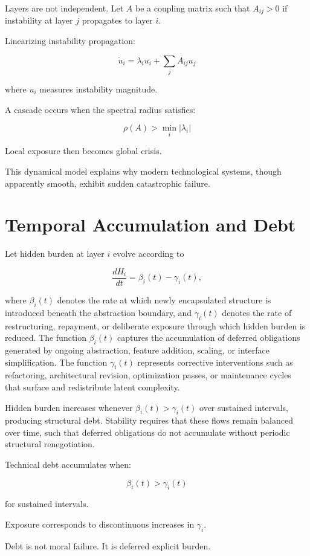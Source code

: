\documentclass[11pt,openany]{book}
\begin{document}
Layers are not independent.
Let $A$ be a coupling matrix such that $A_{ij} > 0$ 
if instability at layer $j$ propagates to layer $i$.

Linearizing instability propagation:

\[
\dot{u}_i = \lambda_i u_i + \sum_j A_{ij} u_j
\]

where $u_i$ measures instability magnitude.

A cascade occurs when the spectral radius satisfies:

\[
\rho(A) > \min_i |\lambda_i|
\]

Local exposure then becomes global crisis.

This dynamical model explains why modern technological systems,
though apparently smooth,
exhibit sudden catastrophic failure.

\section{Temporal Accumulation and Debt}

Let hidden burden at layer $i$ evolve according to

\[
\frac{dH_i}{dt} = \beta_i(t) - \gamma_i(t),
\]

where $\beta_i(t)$ denotes the rate at which newly encapsulated structure is 
introduced beneath the abstraction boundary, and $\gamma_i(t)$ denotes the rate 
of restructuring, repayment, or deliberate exposure through which hidden burden 
is reduced. The function $\beta_i(t)$ captures the accumulation of deferred 
obligations generated by ongoing abstraction, feature addition, scaling, or 
interface simplification. The function $\gamma_i(t)$ represents corrective 
interventions such as refactoring, architectural revision, optimization passes, 
or maintenance cycles that surface and redistribute latent complexity.

Hidden burden increases whenever $\beta_i(t) > \gamma_i(t)$ over sustained intervals, 
producing structural debt. Stability requires that these flows remain balanced 
over time, such that deferred obligations do not accumulate without periodic 
structural renegotiation.

Technical debt accumulates when:

\[
\beta_i(t) > \gamma_i(t)
\]

for sustained intervals.

Exposure corresponds to discontinuous increases in $\gamma_i$.

Debt is not moral failure.
It is deferred explicit burden.
\end{document}
